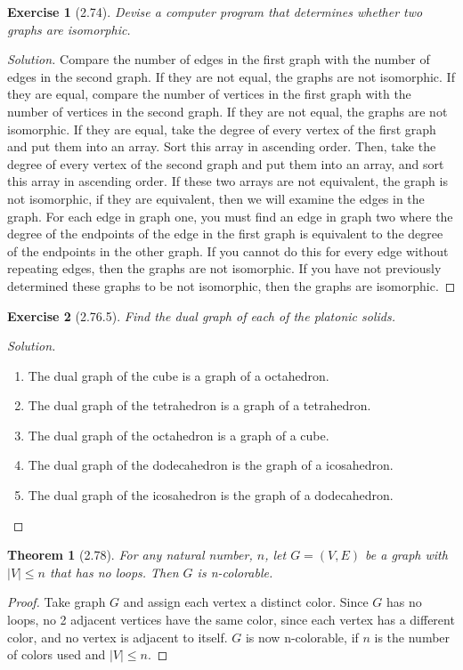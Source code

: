 \documentclass{article}
\newtheorem*{thm}{Theorem}
\newtheorem*{ex}{Exercise}
\newenvironment{solution}
  {\begin{proof}[Solution]}
  {\renewcommand{\qedsymbol}{}\end{proof}}
\begin{document}
\begin{ex}[2.74]
	Devise a computer program that determines whether two graphs are isomorphic.
\end{ex}
\begin{solution}
	Compare the number of edges in the first graph with the number of edges in the second graph. If they are not equal, the graphs are not isomorphic. If they are equal, compare the number of vertices in the first
	graph with the number of vertices in the second graph. If they are not equal, the graphs are not isomorphic. If they are equal, take the degree of every vertex of the first graph and put them into an array. Sort this
	array in ascending order. Then, take the degree of every vertex of the second graph and put them into an array, and sort this array in ascending order. If these two arrays are not equivalent, the graph is not
	isomorphic, if they are equivalent, then we will examine the edges in the graph. For each edge in graph one, you must find an edge in graph two where the degree of the endpoints of the edge in the first graph is 
	equivalent to the degree of the endpoints in the other graph. If you cannot do this for every edge without repeating edges, then the graphs are not isomorphic. If you have not previously determined these graphs to be 
	not isomorphic, then the graphs are isomorphic. 
\end{solution}

\begin{ex}[2.76.5]
	Find the dual graph of each of the platonic solids.
\end{ex}
\begin{solution}
	\begin{enumerate}

	  \item The dual graph of the cube is a graph of a octahedron.
	  \item The dual graph of the tetrahedron is a graph of a tetrahedron.
	  \item The dual graph of the octahedron is a graph of a cube.
	  \item The dual graph of the dodecahedron is the graph of a icosahedron.
	  \item The dual graph of the icosahedron is the graph of a dodecahedron. 

	\end{enumerate}

\end{solution}

\begin{thm}[2.78]
	For any natural number, $n$, let $G = (V,E)$ be a graph with $|V| \leq n$ that has no loops. Then $G$ is n-colorable. 
\end{thm}
\begin{proof}
	Take graph $G$ and assign each vertex a distinct color. Since $G$ has no loops, no 2 adjacent vertices have the same color, since each vertex has a different color, and no vertex is adjacent to itself. 
	$G$ is now n-colorable, if $n$ is the number of colors used and $|V| \leq n$. 
\end{proof}
\end{document}
